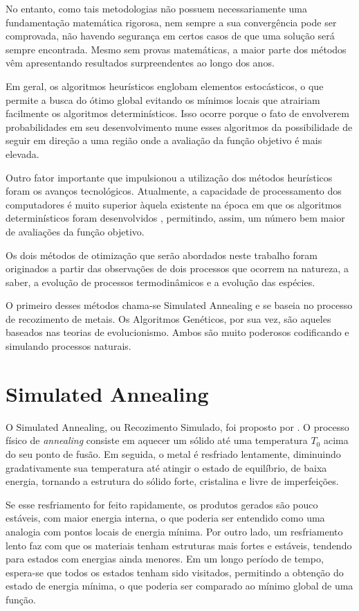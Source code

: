 \documentclass[conference,compsoc]{IEEEtran}
\begin{document}
No entanto, como tais metodologias não possuem necessariamente uma fundamentação matemática rigorosa, nem sempre a sua convergência pode ser comprovada, não havendo segurança em certos casos de que uma solução será sempre encontrada. Mesmo sem provas matemáticas, a maior parte dos métodos vêm apresentando resultados surpreendentes ao longo dos anos.

Em geral, os algoritmos heurísticos englobam elementos estocásticos, o que permite a busca do ótimo global evitando os mínimos locais que atrairiam facilmente os algoritmos determinísticos.  Isso ocorre porque o fato de envolverem probabilidades em seu desenvolvimento mune esses algoritmos da possibilidade de seguir em direção a uma região onde a avaliação da função objetivo é mais elevada.

Outro fator importante que impulsionou a utilização dos métodos heurísticos foram os avanços tecnológicos. Atualmente, a capacidade de processamento dos computadores é muito superior àquela existente na época em que os algoritmos determinísticos foram desenvolvidos , permitindo, assim, um número bem maior de avaliações da função objetivo.

Os dois métodos de otimização que serão abordados neste trabalho foram originados a partir das observações de dois processos que ocorrem na natureza, a saber, a evolução de processos termodinâmicos e a evolução das espécies.

O primeiro desses métodos chama-se Simulated Annealing e se baseia no processo de recozimento de metais. Os Algoritmos Genéticos, por sua vez, são aqueles baseados nas teorias de evolucionismo. Ambos são muito poderosos codificando e simulando processos naturais.\\


\section{Simulated Annealing}
\vspace{0.3cm}

O Simulated Annealing, ou Recozimento Simulado, foi proposto por \cite{SA}. O processo físico de \textit{annealing} consiste em aquecer um sólido até uma temperatura $T_0$ acima do seu ponto de fusão. Em seguida, o metal é resfriado lentamente, diminuindo gradativamente sua temperatura até atingir o estado de equilíbrio, de baixa energia, tornando a estrutura do sólido forte, cristalina e livre de imperfeições.

Se esse resfriamento for feito rapidamente, os produtos gerados são pouco estáveis, com maior energia interna, o que poderia ser entendido como uma analogia com pontos locais de energia mínima. Por outro lado, um resfriamento lento faz com que os materiais tenham estruturas mais fortes e estáveis, tendendo para estados com energias ainda menores. Em um longo período de tempo, espera-se que todos os estados tenham sido visitados, permitindo a obtenção do estado de energia mínima, o que poderia ser comparado ao mínimo global de uma função.
\end{document}
